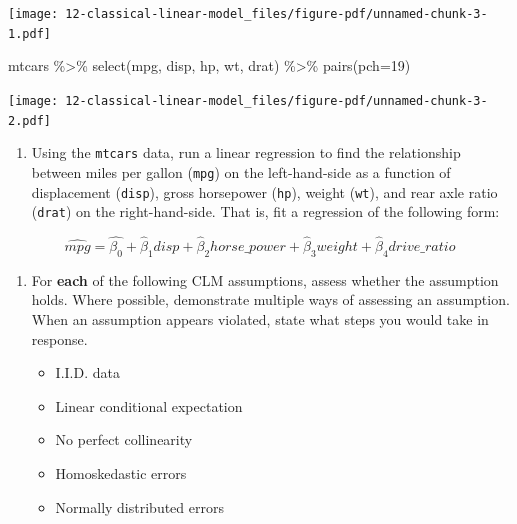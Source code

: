 \documentclass[
  letterpaper,
  DIV=11,
  numbers=noendperiod]{scrreprt}
\newenvironment{Shaded}{\begin{snugshade}}{\end{snugshade}}
\newcommand{\AttributeTok}[1]{\textcolor[rgb]{0.40,0.45,0.13}{#1}}
\newcommand{\DecValTok}[1]{\textcolor[rgb]{0.68,0.00,0.00}{#1}}
\newcommand{\FunctionTok}[1]{\textcolor[rgb]{0.28,0.35,0.67}{#1}}
\newcommand{\NormalTok}[1]{\textcolor[rgb]{0.00,0.23,0.31}{#1}}
\newcommand{\SpecialCharTok}[1]{\textcolor[rgb]{0.37,0.37,0.37}{#1}}
\providecommand{\tightlist}{%
  \setlength{\itemsep}{0pt}\setlength{\parskip}{0pt}}\usepackage{longtable,booktabs,array}
\begin{document}
\texttt{[image: 12-classical-linear-model\_files/figure-pdf/unnamed-chunk-3-1.pdf]}

\begin{Shaded}
\begin{Highlighting}[]
\NormalTok{mtcars }\SpecialCharTok{\%\textgreater{}\%} 
  \FunctionTok{select}\NormalTok{(mpg, disp, hp, wt, drat) }\SpecialCharTok{\%\textgreater{}\%} 
  \FunctionTok{pairs}\NormalTok{(}\AttributeTok{pch=}\DecValTok{19}\NormalTok{)}
\end{Highlighting}
\end{Shaded}

\texttt{[image: 12-classical-linear-model\_files/figure-pdf/unnamed-chunk-3-2.pdf]}

\begin{enumerate}
\def\labelenumi{\arabic{enumi}.}
\tightlist
\item
  Using the \texttt{mtcars} data, run a linear regression to find the
  relationship between miles per gallon (\texttt{mpg}) on the
  left-hand-side as a function of displacement (\texttt{disp}), gross
  horsepower (\texttt{hp}), weight (\texttt{wt}), and rear axle ratio
  (\texttt{drat}) on the right-hand-side. That is, fit a regression of
  the following form:
\end{enumerate}

\[
\widehat{mpg} = \hat{\beta_{0}} + \hat{\beta}_{1} disp + \hat{\beta}_{2}horse\_power + \hat{\beta}_{3}weight + \hat{\beta}_{4}drive\_ratio
\]

\begin{enumerate}
\def\labelenumi{\arabic{enumi}.}
\setcounter{enumi}{1}
\tightlist
\item
  For \textbf{each} of the following CLM assumptions, assess whether the
  assumption holds. Where possible, demonstrate multiple ways of
  assessing an assumption. When an assumption appears violated, state
  what steps you would take in response.

  \begin{itemize}
  \tightlist
  \item
    I.I.D. data
  \item
    Linear conditional expectation
  \item
    No perfect collinearity
  \item
    Homoskedastic errors
  \item
    Normally distributed errors
  \end{itemize}
\end{enumerate}
\end{document}
